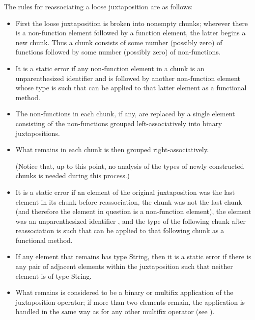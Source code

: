 The rules for reassociating a loose juxtaposition are as follows:
\begin{itemize}
\item
First the loose juxtaposition is broken
into nonempty chunks; wherever there is a non-function element followed by a
function element, the latter begins a new chunk.  Thus a chunk
consists of some number (possibly zero) of functions followed by some
number (possibly zero) of non-functions.

\item
It is a static error if any non-function element in a chunk
is an unparenthesized identifier  and is followed by another non-function
element whose type is such that  can be applied to that latter element
as a functional method.

\item
The non-functions in each
chunk, if any, are replaced by a single element consisting of the
non-functions grouped left-associatively into binary juxtapositions.

\item
What remains in each chunk is then grouped right-associatively.

(Notice that, up to this point, no analysis of the types of newly constructed chunks is needed
during this process.)

\item
It is a static error if an element of the original juxtaposition
was the last element in its chunk before reassociation, the chunk was not the last chunk
(and therefore the element in question is a non-function element),
the element was an unparenthesized identifier ,
and the type of the following chunk after reassociation
is such that  can be applied to that following chunk
as a functional method.

\item
If any element that remains has type String, then it is a static error
if there is any pair of adjacent elements within the juxtaposition
such that neither element is of type String.

\item
What remains is considered to be a binary or multifix application of the juxtaposition
operator; if more than two elements remain, the application is handled in the same
way as for any other multifix operator (see ).
\end{itemize}


